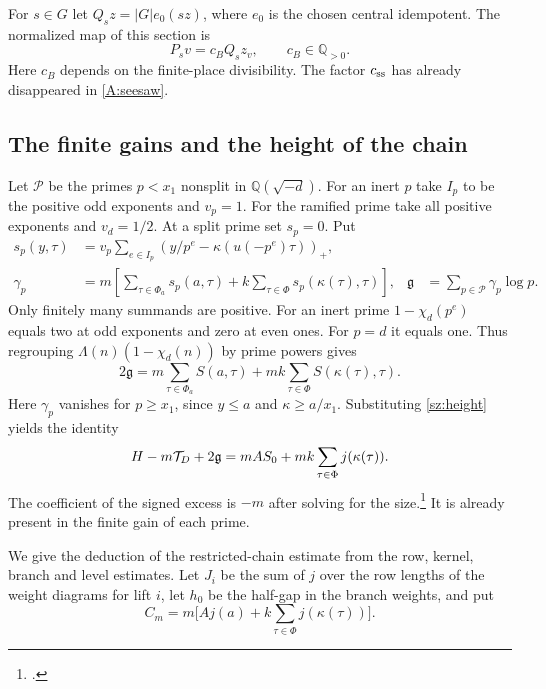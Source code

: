 For $s\in G$ let $Q_s z=|G|e_0(sz)$, where $e_0$ is the chosen central idempotent. The normalized map of this section is
\[
 P_s v=c_BQ_s z_v,\qquad c_B\in\mathbb Q_{>0}.
\]
Here $c_B$ depends on the finite-place divisibility. The factor $c_{\rm ss}$ has already disappeared in \eqref{A:seesaw}.

\subsection{The finite gains and the height of the chain}
Let $\mathcal P$ be the primes $p<x_1$ nonsplit in $\mathbb Q(\sqrt{-d})$. For an inert $p$ take $I_p$ to be the positive odd exponents and $v_p=1$. For the ramified prime take all positive exponents and $v_d=1/2$. At a split prime set $s_p=0$. Put
\begin{align*}
 s_p(y,\tau)&=v_p\sum_{e\in I_p}(y/p^e-\kappa(u(-p^e)\tau))_+,\\
 \gamma_p&=m\left[\sum_{\tau\in\Phi_a}s_p(a,\tau)
                    +k\sum_{\tau\in\Phi}s_p(\kappa(\tau),\tau)\right],
 & \mathfrak g&=\sum_{p\in\mathcal P}\gamma_p\log p .
\end{align*}
Only finitely many summands are positive. For an inert prime $1-\chi_d(p^e)$ equals two at odd exponents and zero at even ones. For $p=d$ it equals one. Thus regrouping $\Lambda(n)(1-\chi_d(n))$ by prime powers gives
\[
 2\mathfrak g=m\sum_{\tau\in\Phi_a} S(a,\tau)+mk\sum_{\tau\in\Phi}S(\kappa(\tau),\tau).
\]
Here $\gamma_p$ vanishes for $p\ge x_1$, since $y\le a$ and $\kappa\ge a/x_1$. Substituting \eqref{sz:height} yields the identity
\begin{equation}
 H-m\mathcal T_D+2\mathfrak g=mA S_0+mk\sum_{\tau\in\Phi}j(\kappa(\tau)).\label{A:gain}
\end{equation}
The coefficient of the signed excess is $-m$ after solving for the size.\footnote{.} It is already present in the finite gain of each prime.

We give the deduction of the restricted-chain estimate from the row, kernel, branch and level estimates. Let $J_i$ be the sum of $j$ over the row lengths of the weight diagrams for lift $i$, let $h_0$ be the half-gap in the branch weights, and put
\[
 C_m=m\biggl[A j(a)+k\sum_{\tau\in\Phi}j(\kappa(\tau))\biggr].
\]
